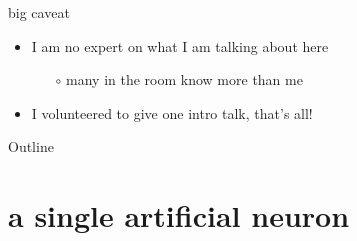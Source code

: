 \documentclass[xcolor={svgnames},
               hyperref={colorlinks,citecolor=DeepPink4,linkcolor=FireBrick,urlcolor=Maroon}]
               {beamer}
\begin{document}
\begin{frame}{big caveat}

\begin{itemize}
\item I am no expert on what I am talking about here
    \begin{itemize}
    \item[$\circ$] many in the room know more than me
    \end{itemize}
\item I volunteered to give one intro talk, that's all!
\end{itemize}
\end{frame}


\begin{frame}{Outline}
  \tableofcontents[hideallsubsections]
\end{frame}

\section{a single artificial neuron}
\end{document}
